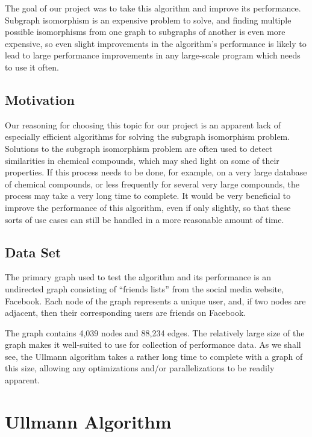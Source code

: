\documentclass{article}
\begin{document}
  The goal of our project was to take this algorithm and improve its performance. Subgraph isomorphism is an expensive problem to solve, and finding multiple possible isomorphisms from one graph to subgraphs of another is even more expensive, so even slight improvements in the algorithm's performance is likely to lead to large performance improvements in any large-scale program which needs to use it often.

  \subsection{Motivation}

  Our reasoning for choosing this topic for our project is an apparent lack of especially efficient algorithms for solving the subgraph isomorphism problem. Solutions to the subgraph isomorphism problem are often used to detect similarities in chemical compounds,\cite{ullmann} which may shed light on some of their properties. If this process needs to be done, for example, on a very large database of chemical compounds, or less frequently for several very large compounds, the process may take a very long time to complete. It would be very beneficial to improve the performance of this algorithm, even if only slightly, so that these sorts of use cases can still be handled in a more reasonable amount of time.

  \subsection{Data Set}

  The primary graph used to test the algorithm and its performance is an undirected graph consisting of ``friends lists'' from the social media website, Facebook. Each node of the graph represents a unique user, and, if two nodes are adjacent, then their corresponding users are friends on Facebook.\cite{fbgraph}

  The graph contains 4,039 nodes and 88,234 edges. The relatively large size of the graph makes it well-suited to use for collection of performance data. As we shall see, the Ullmann algorithm takes a rather long time to complete with a graph of this size, allowing any optimizations and/or parallelizations to be readily apparent.

\section{Ullmann Algorithm}
\end{document}
